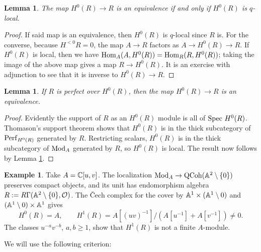 \documentclass[12pt, letter]{amsart}
\newtheorem{lemma}[theorem]{Lemma}
\theoremstyle{definition}
\newtheorem{example}[theorem]{Example}
\newcommand{\OO}{\mathcal O}
\numberwithin{equation}{section}
\begin{document}
\begin{lemma}\label{lem: local implies affine}
The map $H^0(R)\to R$ is an equivalence if and only if $H^0(R)$ is $q$-local.
\end{lemma}
\begin{proof}
If said map is an equivalence, then $H^0(R)$ is $q$-local since $R$ is.  For the converse,
because $H^{< 0}R = 0$, the map $A \to R$ factors as $A \to H^{0}(R) \to R$.  If $H^{0}(R)$ is local, then we have $\operatorname{Hom}_A(A, H^0(R)) = \operatorname{Hom}_R(R, H^0(R))$; taking the image of the above map gives a map $R \to H^0(R)$.  It is an exercise with adjunction to see that it is inverse to $H^0(R) \to R$.
\end{proof}


\begin{lemma}\label{lem: perfect implies affine}
    If $R$ is perfect over $H^0(R)$, then the map $H^0(R) \to R$ is an equivalence.
\end{lemma}
\begin{proof}
Evidently the support of $R$ as an $H^0(R)$ module is all of $\operatorname{Spec} \, H^0(R)$.
Thomason's support theorem \cite[Lemma~3.14]{Thomason} shows that $H^0(R)$ is in the thick subcategory of $\mathrm{Perf}_{H^0(R)}$ generated by $R$.
Restricting scalars, $H^0(R)$ is in the thick subcategory of $\operatorname{Mod}_A$ generated by $R$, so $H^0(R)$ is local.  The result now follows by Lemma \ref{lem: local implies affine}.
\end{proof}




\begin{example}\label{ex:punctured-affine-localization}
Take
$A=\mathbb C[u,v]$.
The localization $\operatorname{Mod}_A\to\operatorname{QCoh}(\mathbb{A}^2\setminus\{0\})$ preserves compact objects,
and its unit has endomorphism algebra $R:=R\Gamma(\bA^2\setminus\{0\},\OO)$.
The \v{C}ech complex for the cover by $\mathbb{A}^1 \times (\mathbb{A}^1 \setminus 0)$ and $(\mathbb{A}^1 \setminus 0) \times \mathbb{A}^1$ gives
\[
 H^0(R)=A,\qquad
 H^1(R)=A[(uv)^{-1}]/(A[u^{-1}]+A[v^{-1}])\ne0.
\]
The classes $u^{-a}v^{-b}$, $a,b\ge1$, show that $H^1(R)$ is not
a finite $A$-module. 
\end{example}




We will use the following criterion: 
\end{document}
